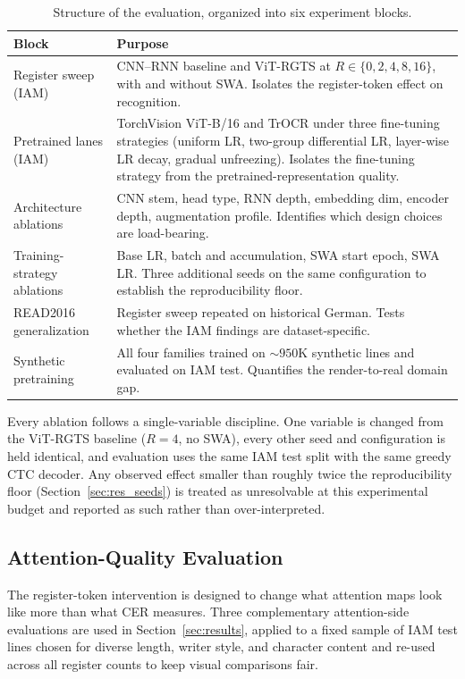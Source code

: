 \begin{table}[h]
\centering
\small
\caption{Structure of the evaluation, organized into six experiment blocks.}
\label{tab:matrix}
\begin{tabular}{lp{9cm}}
\toprule
Block & Purpose \\
\midrule
Register sweep (IAM)         & CNN--RNN baseline and ViT-RGTS at $R \in \{0, 2, 4, 8, 16\}$, with and without SWA. Isolates the register-token effect on recognition. \\
Pretrained lanes (IAM)       & TorchVision ViT-B/16 and TrOCR under three fine-tuning strategies (uniform LR, two-group differential LR, layer-wise LR decay, gradual unfreezing). Isolates the fine-tuning strategy from the pretrained-representation quality. \\
Architecture ablations       & CNN stem, head type, RNN depth, embedding dim, encoder depth, augmentation profile. Identifies which design choices are load-bearing. \\
Training-strategy ablations  & Base LR, batch and accumulation, SWA start epoch, SWA LR. Three additional seeds on the same configuration to establish the reproducibility floor. \\
READ2016 generalization      & Register sweep repeated on historical German. Tests whether the IAM findings are dataset-specific. \\
Synthetic pretraining        & All four families trained on ${\sim}950$K synthetic lines and evaluated on IAM test. Quantifies the render-to-real domain gap. \\
\bottomrule
\end{tabular}
\end{table}

Every ablation follows a single-variable discipline. One variable is changed from the ViT-RGTS baseline ($R = 4$, no SWA), every other seed and configuration is held identical, and evaluation uses the same IAM test split with the same greedy CTC decoder. Any observed effect smaller than roughly twice the reproducibility floor (Section~\ref{sec:res_seeds}) is treated as unresolvable at this experimental budget and reported as such rather than over-interpreted.

\subsection{Attention-Quality Evaluation}
\label{sec:attn_eval}

The register-token intervention is designed to change what attention maps look like more than what CER measures. Three complementary attention-side evaluations are used in Section~\ref{sec:results}, applied to a fixed sample of IAM test lines chosen for diverse length, writer style, and character content and re-used across all register counts to keep visual comparisons fair.

